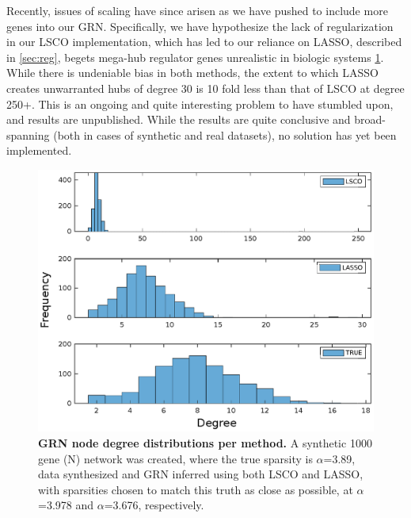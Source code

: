 Recently, issues of scaling have since arisen as we have pushed to include more genes into our GRN. Specifically, we have hypothesize the lack of regularization in our LSCO implementation, which has led to our reliance on LASSO, described in \cref{sec:reg}, begets mega-hub regulator genes unrealistic in biologic systems \cref{fig:hubiness}. While there is undeniable bias in both methods, the extent to which LASSO creates unwarranted hubs of degree 30 is 10 fold less than that of LSCO at degree 250+. This is an ongoing and quite interesting problem to have stumbled upon, and results are unpublished. While the results are quite conclusive and broad-spanning (both in cases of synthetic and real datasets), no solution has yet been implemented.

\begin{figure}[H]
\centering
\includegraphics[width=1\linewidth]{3/hubs.eps}
\caption{\textbf{GRN node degree distributions per method.} A synthetic 1000 gene (N) network was created, where the true sparsity is $\alpha$=3.89, data synthesized and GRN inferred using both LSCO and LASSO, with sparsities chosen to match this truth as close as possible, at $\alpha$=3.978 and $\alpha$=3.676, respectively.}
\label{fig:hubiness}
\end{figure}





